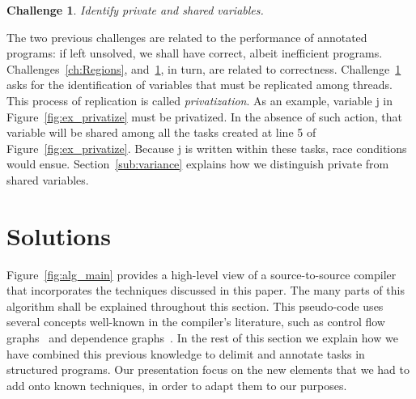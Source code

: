 \documentclass[sigplan,10pt,review,anonymous]{acmart}
\newtheorem{Challenge}{Challenge}[section]
\begin{document}
\begin{Challenge}
\label{ch:privatize}
Identify private and shared variables.
\end{Challenge}

The two previous challenges are related to the performance of annotated
programs: if left unsolved, we shall have correct, albeit inefficient programs.
Challenges~\ref{ch:Regions}, and~\ref{ch:privatize}, in turn, are
related to correctness.
Challenge~\ref{ch:privatize} asks for the identification of variables that
must be replicated among threads.
This process of replication is called {\em privatization}.
As an example, variable \textsf{j} in Figure~\ref{fig:ex_privatize} must
be privatized.
In the absence of such action, that variable will be shared among all the
tasks created at line 5 of Figure~\ref{fig:ex_privatize}.
Because \textsf{j} is written within these tasks, race conditions would
ensue.
Section~\ref{sub:variance} explains how we distinguish private from
shared variables.




\section{Solutions}
\label{sec:sol}

Figure~\ref{fig:alg_main} provides a high-level view of a source-to-source
compiler that incorporates the techniques discussed in this paper.
The many parts of this algorithm shall be explained throughout this section.
This pseudo-code uses several concepts well-known in the compiler's
literature, such as control flow graphs~\cite{Kildall73} and
dependence graphs~\cite{Ferrante87}.
In the rest of this section we explain how we have combined this previous
knowledge to delimit and annotate tasks in structured programs.
Our presentation focus on the new elements that we had to add onto known
techniques, in order to adapt them to our purposes.
\end{document}
